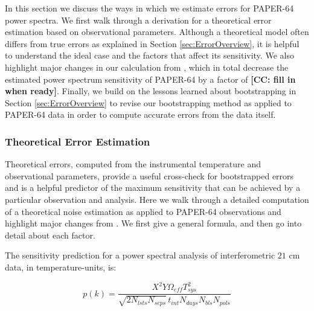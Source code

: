 \documentclass[preprint2,numberedappendix,tighten]{aastex6}  %
\newcommand{\cc}[1]{{\color{purple} \textbf{[CC: #1]}}}
\begin{document}
In this section we discuss the ways in which we estimate errors for PAPER-64 power spectra. We first walk through a derivation for a theoretical error estimation based on observational parameters. Although a theoretical model often differs from true errors as explained in Section \ref{sec:ErrorOverview}, it is helpful to understand the ideal case and the factors that affect its sensitivity. We also highlight major changes in our calculation from \citet{ali_et_al2015}, which in total decrease the estimated power spectrum sensitivity of PAPER-64 by a factor of \cc{fill in when ready}. Finally, we build on the lessons learned about bootstrapping in Section \ref{sec:ErrorOverview} to revise our bootstrapping method as applied to PAPER-64 data in order to compute accurate errors from the data itself.

\subsubsection{Theoretical Error Estimation}
\label{sec:PSSense}

Theoretical errors, computed from the instrumental temperature and observational parameters, provide a useful cross-check for bootstrapped errors and is a helpful predictor of the maximum sensitivity that can be achieved by a particular observation and analysis. Here we walk through a detailed computation of a theoretical noise estimation as applied to PAPER-64 observations and highlight major changes from \citet{ali_et_al2015}. We first give a general formula, and then go into detail about each factor.

The sensitivity prediction for a power spectral analysis of interferometric $21$ cm data, in temperature-units, is:

\begin{equation}
\label{eq:sense}
p(k) = \frac{X^{2}Y \Omega_{eff} T_{sys}^{2}}{\sqrt{2N_{lsts}N_{seps}}\,t_{int}N_{days}N_{bls}N_{pols}}
\end{equation}
\end{document}
